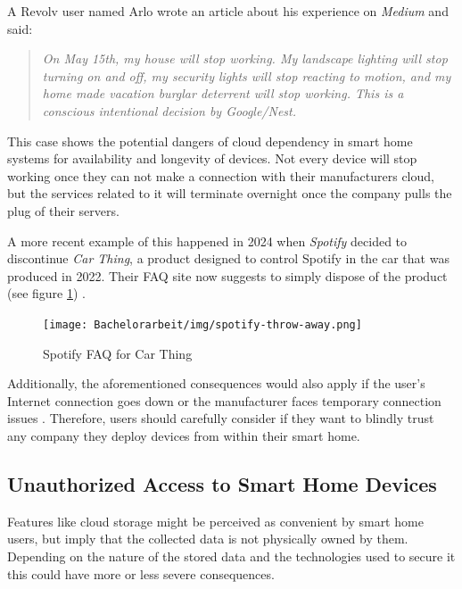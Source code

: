 A Revolv user named Arlo wrote an article about his experience on \textit{Medium} and said: \blockquote{\textit{On May 15th, my house will stop working. My landscape lighting will stop turning on and off, my security lights will stop reacting to motion, and my home made vacation burglar deterrent will stop working. This is a conscious intentional decision by Google/Nest.} \cite{Gilbert2016Nest}}

This case shows the potential dangers of cloud dependency in smart home systems for availability and longevity of devices. Not every device will stop working once they can not make a connection with their manufacturers cloud, but the services related to it will terminate overnight once the company pulls the plug of their servers. 

A more recent example of this happened in 2024 when \textit{Spotify} decided to discontinue \textit{Car Thing}, a product designed to control Spotify in the car that was produced in 2022. Their FAQ site now suggests to simply dispose of the product (see figure \ref{fig:Spotify-FAQ-CarThing}) \cite{OpenHomeBlog_CloudProducts}.

\begin{figure}[H]
    \centering
    \texttt{[image: Bachelorarbeit/img/spotify-throw-away.png]}
    \caption{Spotify FAQ for Car Thing \cite{OpenHomeBlog_CloudProducts}}
    \label{fig:Spotify-FAQ-CarThing}
\end{figure}

Additionally, the aforementioned consequences would also apply if the user's Internet connection goes down or the manufacturer faces temporary connection issues \cite{BertkoChris2017HSH:}. Therefore, users should carefully consider if they want to blindly trust any company they deploy devices from within their smart home.

\subsection{Unauthorized Access to Smart Home Devices}
Features like cloud storage might be perceived as convenient by smart home users, but imply that the collected data is not physically owned by them. Depending on the nature of the stored data and the technologies used to secure it this could have more or less severe consequences.

